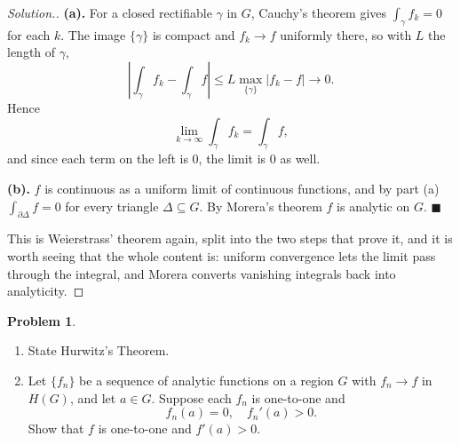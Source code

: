 \documentclass[11pt,a4paper]{article}
\theoremstyle{definition}
\newtheorem{problemx}{Problem}[section]
\newenvironment{problem}{\begin{problemx}}{\end{problemx}}
\newenvironment{solution}
  {\renewcommand{\qedsymbol}{}\begin{proof}[\textit{Solution}.]}
  {\end{proof}}
\begin{document}
\begin{solution}
\textbf{(a).} For a closed rectifiable $\gamma$ in $G$, Cauchy's theorem gives
$\int_{\gamma} f_k = 0$ for each $k$. The image $\{\gamma\}$ is compact and
$f_k \rightarrow f$ uniformly there, so with $L$ the length of $\gamma$,
$$\left|\int_{\gamma} f_k - \int_{\gamma} f\right|
\leq L\max_{\{\gamma\}}\left|f_k - f\right| \longrightarrow 0 .$$
Hence
$$\lim_{k\to\infty}\int_{\gamma} f_k = \int_{\gamma} f ,$$
and since each term on the left is $0$, the limit is $0$ as well.

\textbf{(b).} $f$ is continuous as a uniform limit of continuous functions, and by
part (a) $\int_{\partial\Delta} f = 0$ for every triangle $\Delta \subseteq G$. By
Morera's theorem $f$ is analytic on $G$. $\blacksquare$

This is Weierstrass' theorem again, split into the two steps that prove it, and it
is worth seeing that the whole content is: uniform convergence lets the limit pass
through the integral, and Morera converts vanishing integrals back into
analyticity.
\end{solution}


\begin{problem}
\begin{enumerate}
\item[(a).] State Hurwitz's Theorem.
\item[(b).] Let $\{f_n\}$ be a sequence of analytic functions on a region $G$
with $f_n \rightarrow f$ in $H(G)$, and let $a \in G$. Suppose each $f_n$ is
one-to-one and
$$f_n(a) = 0,\quad  f_n'(a) > 0 .$$
Show that $f$ is one-to-one and $f'(a) > 0$.
\end{enumerate}
\end{problem}
\end{document}
